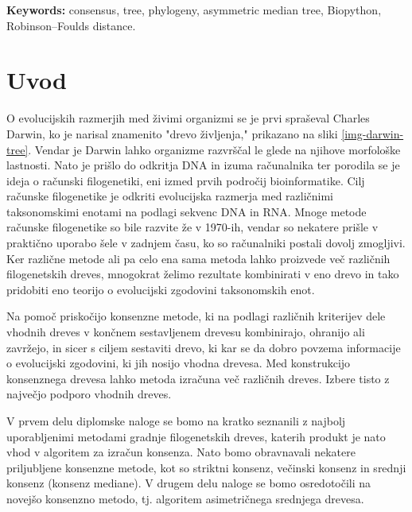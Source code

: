 \documentclass[a4paper, 12pt]{book}
\newcommand{\tkeywordsEn}{consensus, tree, phylogeny, asymmetric median tree, Biopython, Robinson–Foulds distance}
\newcommand{\clearemptydoublepage}{\newpage{\pagestyle{empty}\cleardoublepage}}
\begin{document}
\noindent\textbf{Keywords:} \tkeywordsEn.
\clearemptydoublepage

\mainmatter
\setcounter{page}{1}
\pagestyle{fancy}

\chapter{Uvod}
O evolucijskih razmerjih med živimi organizmi se je prvi spraševal Charles Darwin,
ko je narisal znamenito "drevo življenja," prikazano na sliki \ref{img-darwin-tree}.
Vendar je Darwin lahko organizme razvrščal le glede na njihove morfološke lastnosti.
Nato je prišlo do odkritja DNA in izuma računalnika ter porodila se je ideja o računski
filogenetiki, eni izmed prvih področij bioinformatike. Cilj računske filogenetike je 
odkriti evolucijska razmerja med različnimi taksonomskimi enotami na podlagi sekvenc DNA in RNA.
Mnoge metode računske filogenetike so bile razvite že v 1970-ih, vendar so
nekatere prišle v praktično uporabo šele v zadnjem času, ko so računalniki postali dovolj zmogljivi.
Ker različne metode ali pa celo ena sama metoda lahko proizvede več 
različnih filogenetskih dreves, mnogokrat želimo rezultate kombinirati v eno drevo in 
tako pridobiti eno teorijo o evolucijski zgodovini taksonomskih enot. 

Na pomoč priskočijo konsenzne metode, ki na podlagi različnih  kriterijev dele 
vhodnih dreves v končnem sestavljenem drevesu kombinirajo, ohranijo ali zavržejo,
in sicer s ciljem sestaviti drevo, ki kar se da dobro povzema informacije o evolucijski 
zgodovini, ki jih nosijo vhodna drevesa. Med konstrukcijo konsenznega drevesa lahko 
metoda izračuna več različnih dreves. Izbere tisto z največjo podporo 
vhodnih dreves.

V prvem delu diplomske naloge se bomo na kratko seznanili z najbolj uporabljenimi
metodami gradnje filogenetskih dreves, katerih produkt je nato vhod v algoritem 
za izračun konsenza. Nato bomo obravnavali nekatere priljubljene konsenzne metode, 
kot so striktni konsenz, večinski konsenz in srednji konsenz (konsenz mediane). 
V drugem delu naloge se bomo osredotočili na novejšo konsenzno metodo, tj. algoritem
asimetričnega srednjega drevesa. 
\end{document}
